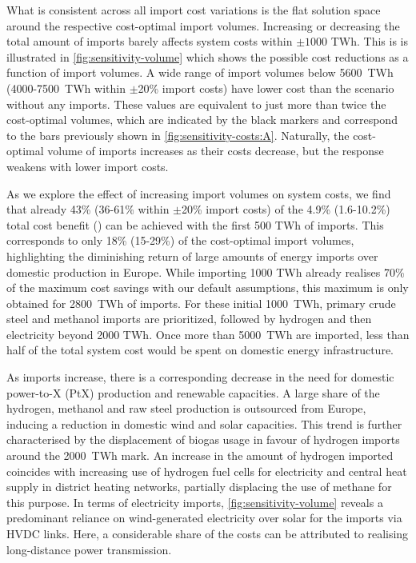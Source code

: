 What is consistent across all import cost variations is the flat solution space
around the respective cost-optimal import volumes. Increasing or decreasing the
total amount of imports barely affects system costs within $\pm 1000$ TWh. This
is is illustrated in \cref{fig:sensitivity-volume} which shows the possible cost
reductions as a function of import volumes. A wide range of import volumes below
5600~TWh (4000-7500~TWh within $\pm$20\% import costs) have lower cost than the
scenario without any imports. These values are equivalent to just more than
twice the cost-optimal volumes, which are indicated by the black markers
and correspond to the bars previously shown in \cref{fig:sensitivity-costs:A}.
Naturally, the cost-optimal volume of imports increases as their costs decrease,
but the response weakens with lower import costs.

As we explore the effect of increasing import volumes on system costs, we find
that already 43\% (36-61\% within $\pm$20\% import costs) of the 4.9\%
(1.6-10.2\%) total cost benefit () can be achieved with the first 500
TWh of imports. This corresponds to only 18\% (15-29\%) of the cost-optimal
import volumes, highlighting the diminishing return of large amounts of energy
imports over domestic production in Europe. While importing 1000 TWh already
realises 70\% of the maximum cost savings with our default assumptions, this
maximum is only obtained for 2800~TWh of imports. For these initial 1000~TWh,
primary crude steel and methanol imports are prioritized, followed by hydrogen
and then electricity beyond 2000 TWh. Once more than 5000~TWh are imported, less
than half of the total system cost would be spent on domestic energy
infrastructure.

As imports increase, there is a corresponding decrease in the need for domestic
power-to-X (PtX) production and renewable capacities. A large share of the
hydrogen, methanol and raw steel production is outsourced from Europe, inducing
a reduction in domestic wind and solar capacities. This trend is further
characterised by the displacement of biogas usage in favour of hydrogen imports
around the 2000~TWh mark. An increase in the amount of hydrogen imported
coincides with increasing use of hydrogen fuel cells for electricity and central
heat supply in district heating networks, partially displacing the use of
methane for this purpose. In terms of electricity imports,
\cref{fig:sensitivity-volume} reveals a predominant reliance on wind-generated
electricity over solar for the imports via HVDC links. Here, a considerable
share of the costs can be attributed to realising long-distance power
transmission.

